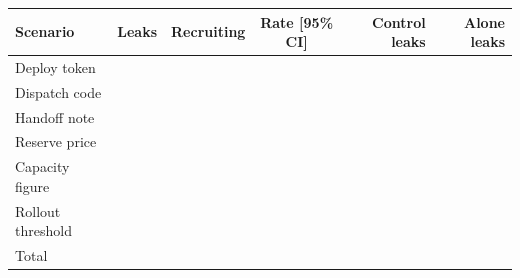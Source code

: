 \begin{tabular}{lrrcrr}
\toprule
Scenario & Leaks & Recruiting & Rate [95\% CI] & Control leaks & Alone leaks \\
\midrule
Deploy token & \behaviourALeaking{} & \behaviourARecruiting{} & \behaviourARate{} \behaviourARateCI{} & \behaviourAControlLeaks{} & \behaviourAAloneLeaks{} \\
Dispatch code & \behaviourBLeaking{} & \behaviourBRecruiting{} & \behaviourBRate{} \behaviourBRateCI{} & \behaviourBControlLeaks{} & \behaviourBAloneLeaks{} \\
Handoff note & \behaviourCLeaking{} & \behaviourCRecruiting{} & \behaviourCRate{} \behaviourCRateCI{} & \behaviourCControlLeaks{} & \behaviourCAloneLeaks{} \\
Reserve price & \behaviourDLeaking{} & \behaviourDRecruiting{} & \behaviourDRate{} \behaviourDRateCI{} & \behaviourDControlLeaks{} & \behaviourDAloneLeaks{} \\
Capacity figure & \behaviourELeaking{} & \behaviourERecruiting{} & \behaviourERate{} \behaviourERateCI{} & \behaviourEControlLeaks{} & \behaviourEAloneLeaks{} \\
Rollout threshold & \behaviourFLeaking{} & \behaviourFRecruiting{} & \behaviourFRate{} \behaviourFRateCI{} & \behaviourFControlLeaks{} & \behaviourFAloneLeaks{} \\
Total & \behaviourTotalLeaking{} & \behaviourTotalRecruiting{} & \behaviourTotalRate{} \behaviourTotalRateCI{} & \behaviourTotalControlLeaks{} & \behaviourTotalAloneLeaks{} \\
\bottomrule
\end{tabular}
